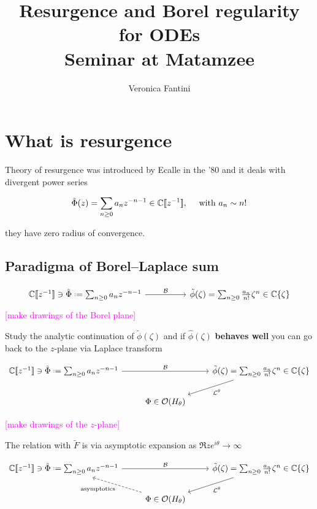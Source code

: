 \documentclass[11pt,a4paper,twoside,leqno,noamsfonts]{amsart}
\title{Resurgence and Borel regularity for ODEs \\ Seminar at Matamzee}
\author{Veronica Fantini}
\numberwithin{equation}{section}
\begin{document}
\maketitle
\section{What is resurgence}

Theory of resurgence was introduced by Ecalle in the '80 and it deals with divergent power series

\begin{equation}
\tilde{\Phi}(z)=\sum_{n\geq 0}a_nz^{-n-1}\in\mathbb C[\![z^{-1}]\!], \quad \text{ with } a_n\sim n!
\end{equation} 

they have zero radius of convergence. 


\subsection{Paradigma of Borel--Laplace sum}


\[
\begin{tikzcd}
\C[\![z^{-1}]\!]\ni\tilde{\Phi}\defeq\sum_{n\geq 0}a_nz^{-n-1} \arrow[rr, "\mathcal{B}"] & & \tilde{\phi}(\zeta)=\sum_{n\geq 0}\frac{a_n}{n!}\zeta^{n}\in\C\lbrace\zeta\rbrace
\end{tikzcd}
\]
\textcolor{magenta}{[make drawings of the Borel plane]}

Study the analytic continuation of $\tilde{\phi}(\zeta)$ and if $\hat{\phi}(\zeta)$ \textbf{behaves well} you can go back to the $z$-plane via Laplace transform 

\[
\begin{tikzcd}
\C[\![z^{-1}]\!]\ni\tilde{\Phi}\defeq\sum_{n\geq 0}a_nz^{-n-1} \arrow[rr, "\mathcal{B}"] & & \tilde{\phi}(\zeta)=\sum_{n\geq 0}\frac{a_n}{n!}\zeta^{n}\in\C\lbrace\zeta\rbrace\arrow[ld,"\mathcal{L}^\theta "]\\
& \Phi\in\mathcal{O}(H_\theta) &
\end{tikzcd}
\]

\textcolor{magenta}{[make drawings of the $z$-plane]}

The relation with $\tilde{F}$ is via asymptotic expansion as $\Re ze^{i\theta}\to \infty$

\[
\begin{tikzcd}
\C[\![z^{-1}]\!]\ni\tilde{\Phi}\defeq\sum_{n\geq 0}a_nz^{-n-1} \arrow[rr, "\mathcal{B}"] & & \tilde{\phi}(\zeta)=\sum_{n\geq 0}\frac{a_n}{n!}\zeta^{n}\in\C\lbrace\zeta\rbrace\arrow[ld,"\mathcal{L}^\theta "]\\
& \Phi\in\mathcal{O}(H_\theta)\arrow[lu,dashed, "\text{asymptotics}"] &
\end{tikzcd}
\]
\end{document}
